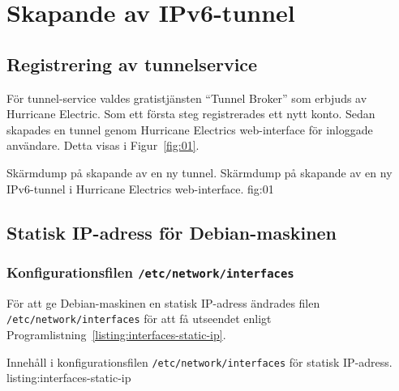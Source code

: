 %
%
%


\section{Skapande av IPv6-tunnel}
\subsection{Registrering av tunnelservice}
För tunnel-service valdes gratistjänsten ``Tunnel Broker'' som erbjuds av
Hurricane Electric.  Som ett första steg registrerades ett nytt konto. Sedan
skapades en tunnel genom Hurricane Electrics web-interface för inloggade
användare. Detta visas i Figur~\ref{fig:01}.

           {Skärmdump på skapande av en ny tunnel.}
           {Skärmdump på skapande av en ny IPv6-tunnel i Hurricane Electrics
            web-interface.}
           {fig:01}


\subsection{Statisk IP-adress för Debian-maskinen}
\subsubsection{Konfigurationsfilen \texttt{/etc/network/interfaces}}
För att ge Debian-maskinen en statisk IP-adress ändrades filen \texttt{/etc/network/interfaces}
för att få utseendet enligt Programlistning~\ref{listing:interfaces-static-ip}.

            {Innehåll i konfigurationsfilen \texttt{/etc/network/interfaces}
 					   för statisk IP-adress.}
            {listing:interfaces-static-ip}



